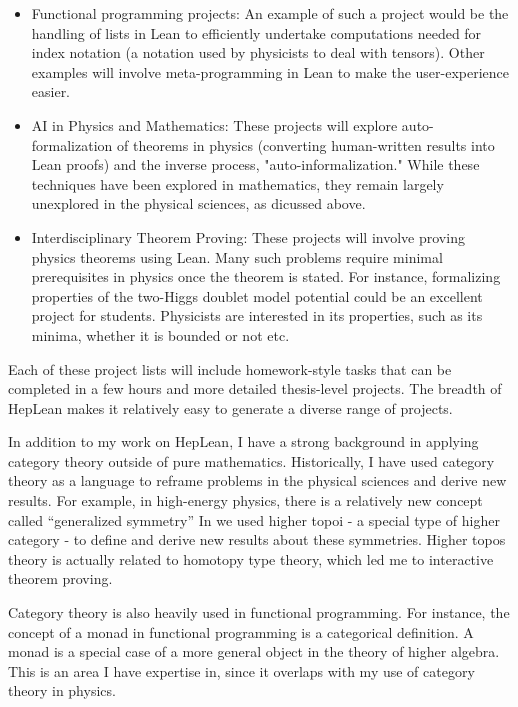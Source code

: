 \documentclass[12pt,letter]{article}
\newcounter{customtitle}
\begin{document}
\begin{itemize}
	\item Functional programming projects: An example of such a project would be the handling of lists in Lean to efficiently undertake computations needed for index notation (a notation used by physicists to deal with tensors). Other examples will involve meta-programming in Lean to make the user-experience easier.
\item AI in Physics and Mathematics: These projects will explore auto-formalization of theorems in physics (converting human-written results into Lean proofs) and the inverse process, "auto-informalization." While these techniques have been explored in mathematics, they remain largely unexplored in the physical sciences, as dicussed above.
\item Interdisciplinary Theorem Proving: These projects will involve proving physics theorems using Lean. Many such problems require minimal prerequisites in physics once the theorem is stated. For instance, formalizing properties of the two-Higgs doublet model potential could be an excellent project for students. Physicists are interested in its properties, 
such as its minima, whether it is bounded or not etc.
\end{itemize}
Each of these project lists will include homework-style tasks that can be completed in a few hours and more detailed thesis-level projects. The breadth of HepLean makes it relatively easy to generate a diverse range of projects.


In addition to my work on HepLean, I have a strong background in applying category theory outside of pure mathematics. Historically, I have used category theory as a language to reframe problems in the physical sciences and derive new results. For example, in high-energy physics, there is a relatively new concept called ``generalized symmetry'' In \js{} we used higher topoi - a special type of higher category - to define and derive new results about these symmetries. Higher topos theory is actually related to homotopy type theory, which led me to interactive theorem proving.

Category theory is also heavily used in functional programming. For instance, the concept of a monad in functional programming is a categorical definition. A monad is a special case of a more general object in the theory of higher algebra. 
This is an area I have expertise in, since it overlaps with my use of category theory in physics. 
\end{document}
